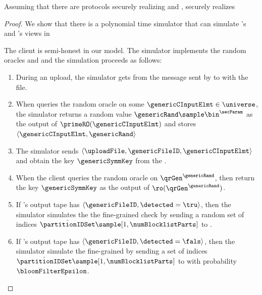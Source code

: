 
\begin{theorem}
Assuming that there are protocols securely realizing \distSigningFunc and \authOPRFFunc, \protocolEM securely realizes \contentModFunc 
\end{theorem}

\begin{proof}

We show that there is a polynomial time simulator that can simulate \client's and \server's views in \protocolEM

%
The client is semi-honest in our model. The simulator implements the random oracles \primeRO and \ro and the simulation proceeds as follows: 

\begin{enumerate}
\item During an upload, the simulator gets \genericFileID from the message sent by \client to \server with the file.  
\item When \client queries the random oracle \primeRO  on some $\genericCInputElmt \in \universe$, the simulator returns a random value $\genericRand \sample \bin^{\secParam}$ as the output of $\primeRO(\genericCInputElmt)$ and stores $\langle \genericCInputElmt, \genericRand \rangle$ 
\item  The simulator sends $\langle \uploadFile, \genericFileID, \genericCInputElmt \rangle$ and obtain the key
$\genericSymmKey$ from the \contentModFunc. 
\item When the client queries the random oracle \ro on $\qrGen^{\genericRand}$, then return the key $\genericSymmKey$ as the output of $\ro(\qrGen^{\genericRand})$. 
\item If \client's output tape has $\langle \genericFileID, \detected = \tru \rangle$, then the simulator simulates the the fine-grained check by sending a random set of indices $\hat{\partitionIDSet} \sample [1, \numBlocklistParts]$ to \client. 
\item If \client's output tape has $\langle \genericFileID, \detected = \fals \rangle$, then the simulator simulate the fine-grained by sending a set of indices $\hat{\partitionIDSet} \sample [1, \numBlocklistParts]$ to \client with probability $\bloomFilterEpsilon$. 
\end{enumerate}




\end{proof}
